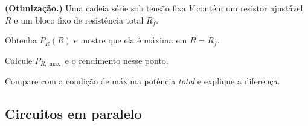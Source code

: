 \begin{questao}[4]{}

\textbf{(Otimização.)} Uma cadeia série sob tensão fixa $V$ contém um resistor
ajustável $R$ e um bloco fixo de resistência total $R_f$.
\begin{itensq}
\item Obtenha $P_R(R)$ e mostre que ela é máxima em $R=R_f$.
\item Calcule $P_{R,\max}$ e o rendimento nesse ponto.
\item Compare com a condição de máxima potência \emph{total} e explique a
      diferença.
\end{itensq}


\end{questao}


\subsection{Circuitos em paralelo}

